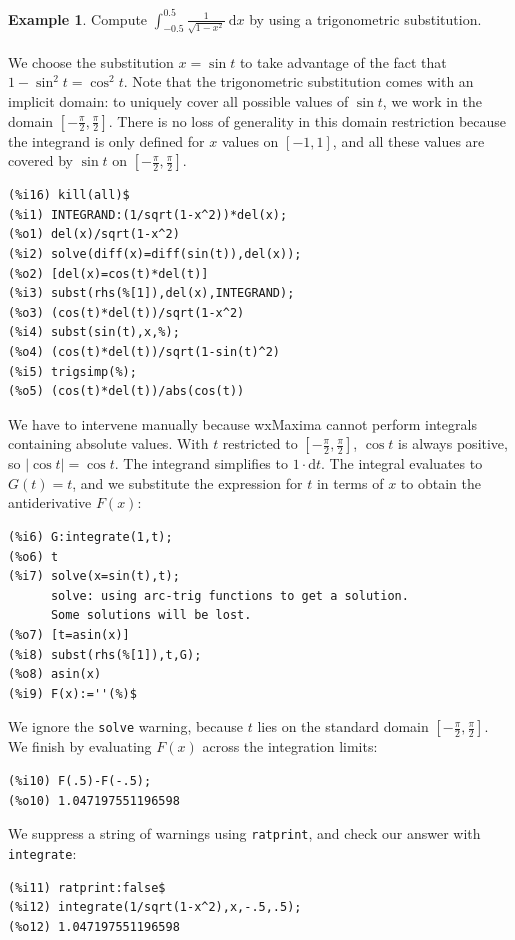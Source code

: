 \documentclass[10.5pt,twoside]{report}
\theoremstyle{definition}
\newtheorem{exmp}{Example}[section]
\begin{document}
\begin{exmp} Compute $\displaystyle \int_{-0.5}^{0.5} \frac{1}{\sqrt{1-x^2}}\ \mathrm{d}x$ by using a trigonometric substitution.\\
${}$\\
We choose the substitution $x=\sin{t}$ to take advantage of the fact that $1-\sin^2{t}=\cos^2{t}$.  Note that the trigonometric substitution comes with an implicit domain:  to uniquely cover all possible values of $\sin{t}$, we work in the domain $[-\frac{\pi}{2},\frac{\pi}{2}]$.  There is no loss of generality in this domain restriction because the integrand is only defined for $x$ values on $[-1,1]$, and all these values are covered by $\sin{t}$ on $[-\frac{\pi}{2},\frac{\pi}{2}]$.

\begin{verbatim}
(%i16) kill(all)$
(%i1) INTEGRAND:(1/sqrt(1-x^2))*del(x);
(%o1) del(x)/sqrt(1-x^2)
(%i2) solve(diff(x)=diff(sin(t)),del(x));
(%o2) [del(x)=cos(t)*del(t)]
(%i3) subst(rhs(%[1]),del(x),INTEGRAND);
(%o3) (cos(t)*del(t))/sqrt(1-x^2)
(%i4) subst(sin(t),x,%);
(%o4) (cos(t)*del(t))/sqrt(1-sin(t)^2)
(%i5) trigsimp(%);
(%o5) (cos(t)*del(t))/abs(cos(t))
\end{verbatim}

We have to intervene manually because wxMaxima cannot perform integrals containing absolute values.  With $t$ restricted to $[-\frac{\pi}{2},\frac{\pi}{2}]$, $\cos{t}$ is always positive, so $|\cos{t}|=\cos{t}$.  The integrand simplifies to $1\cdot \mathrm{d}t$.  The integral evaluates to $G(t)=t$, and we substitute the expression for $t$ in terms of $x$ to obtain the antiderivative $F(x)$:

\begin{verbatim}
(%i6) G:integrate(1,t);
(%o6) t
(%i7) solve(x=sin(t),t);
      solve: using arc-trig functions to get a solution.
      Some solutions will be lost.
(%o7) [t=asin(x)]
(%i8) subst(rhs(%[1]),t,G);
(%o8) asin(x)
(%i9) F(x):=''(%)$
\end{verbatim}

We ignore the \verb|solve| warning, because $t$ lies on the standard domain $[-\frac{\pi}{2},\frac{\pi}{2}]$.  We finish by evaluating $F(x)$ across the integration limits:

\begin{verbatim}
(%i10) F(.5)-F(-.5);
(%o10) 1.047197551196598
\end{verbatim}

We suppress a string of warnings using \verb|ratprint|, and check our answer with \verb|integrate|:

\begin{verbatim}
(%i11) ratprint:false$
(%i12) integrate(1/sqrt(1-x^2),x,-.5,.5);
(%o12) 1.047197551196598
\end{verbatim}

\end{exmp}
\end{document}
